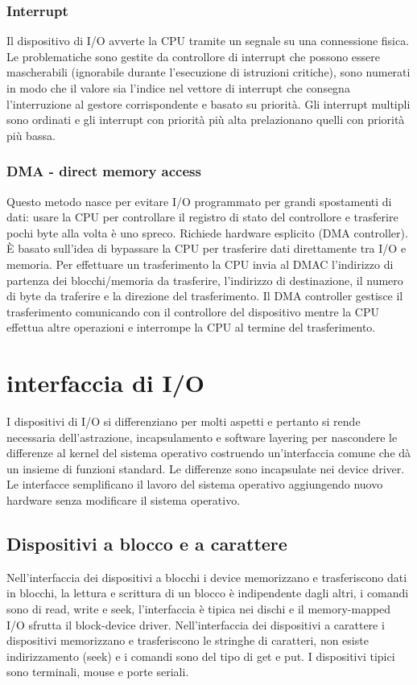 \subsubsection{Interrupt}
Il dispositivo di I/O avverte la CPU tramite un segnale su una connessione fisica. Le problematiche sono gestite da controllore di interrupt che possono essere mascherabili (ignorabile
durante l'esecuzione di istruzioni critiche), sono numerati in modo che il valore sia l'indice nel vettore di interrupt che consegna l'interruzione al gestore corrispondente e basato su
priorit\`a. Gli interrupt multipli sono ordinati e gli interrupt con priorit\`a pi\`u alta prelazionano quelli con priorit\`a pi\`u bassa. 
\subsubsection{DMA - direct memory access}
Questo metodo nasce per evitare I/O programmato per grandi spostamenti di dati: usare la CPU per controllare il registro di stato del controllore e trasferire pochi byte alla volta \`e 
uno spreco. Richiede hardware esplicito (DMA controller). \`E basato sull'idea di bypassare la CPU per trasferire dati direttamente tra I/O e memoria. Per effettuare un trasferimento
la CPU invia al DMAC l'indirizzo di partenza dei blocchi/memoria da trasferire, l'indirizzo di destinazione, il numero di byte da traferire e la direzione del trasferimento. Il DMA
controller gestisce il trasferimento comunicando con il controllore del dispositivo mentre la CPU effettua altre operazioni e interrompe la CPU al termine del trasferimento. 
\section{interfaccia di I/O}
I dispositivi di I/O si differenziano per molti aspetti e pertanto si rende necessaria dell'astrazione, incapsulamento e software layering per nascondere le differenze al kernel del 
sistema operativo costruendo un'interfaccia comune che d\`a un insieme di funzioni standard. Le differenze sono incapsulate nei device driver. Le interfacce semplificano il lavoro del
sistema operativo aggiungendo nuovo hardware senza modificare il sistema operativo. 
\subsection{Dispositivi a blocco e a carattere}
Nell'interfaccia dei dispositivi a blocchi i device memorizzano e trasferiscono dati in blocchi, la lettura e scrittura di un blocco \`e indipendente dagli altri, i comandi sono di 
read, write e seek, l'interfaccia \`e tipica nei dischi e il memory-mapped I/O sfrutta il block-device driver. Nell'interfaccia dei dispositivi a carattere i dispositivi memorizzano e trasferiscono le stringhe di
caratteri, non esiste indirizzamento (seek) e i comandi sono del tipo di get e put. I dispositivi tipici sono terminali, mouse e porte seriali. 
